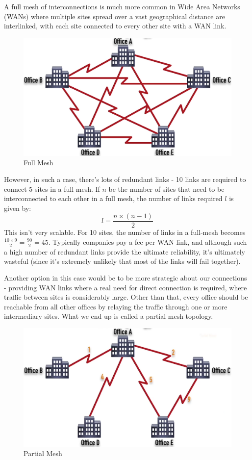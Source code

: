 A full mesh of interconnections is much more common in Wide Area Networks (WANs) where multiple sites spread over a vast geographical distance are interlinked, with each site connected to every other site with a WAN link.
\begin{figure}[H]
	\centering
	\includegraphics[width=0.7\linewidth]{"Mod1/chapters/1.3.b Full Mesh"}
	\caption{Full Mesh}
	\label{fig:full_mesh}
\end{figure}
\noindent
However, in such a case, there's lots of redundant links - 10 links are required to connect 5 sites in a full mesh. If $n$ be the number of sites that need to be interconnected to each other in a full mesh, the number of links required $l$ is given by:
$$
l = \frac{n \times (n-1)}{2}
$$
This isn't very scalable. For 10 sites, the number of links in a full-mesh becomes $\frac{10 \times 9}{2} = \frac{90}{2} = 45$. Typically companies pay a fee per WAN link, and although such a high number of redundant links provide the ultimate reliability, it's ultimately wasteful (since it's extremely unlikely that most of the links will fail together).  

Another option in this case would be to be more strategic about our connections - providing WAN links where a real need for direct connection is required, where traffic between sites is considerably large. Other than that, every office should be reachable from all other offices by relaying the traffic through one or more intermediary sites. What we end up is called a partial mesh topology. 

\begin{figure}[H]
	\centering
	\includegraphics[width=0.7\linewidth]{"Mod1/chapters/1.3.c Partial Mesh"}
	\caption{Partial Mesh}
	\label{fig:partial_mesh}
\end{figure}

